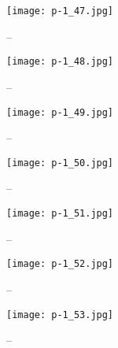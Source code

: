 \clearpage


\begin{figure}
    \begin{center}
        \texttt{[image: p-1\_47.jpg]}
        \caption{--}
    \end{center}
\end{figure}

\clearpage


\begin{figure}
    \begin{center}
        \texttt{[image: p-1\_48.jpg]}
        \caption{--}
    \end{center}
\end{figure}

\clearpage


\begin{figure}
    \begin{center}
        \texttt{[image: p-1\_49.jpg]}
        \caption{--}
    \end{center}
\end{figure}

\clearpage


\begin{figure}
    \begin{center}
        \texttt{[image: p-1\_50.jpg]}
        \caption{--}
    \end{center}
\end{figure}

\clearpage


\begin{figure}
    \begin{center}
        \texttt{[image: p-1\_51.jpg]}
        \caption{--}
    \end{center}
\end{figure}

\clearpage


\begin{figure}
    \begin{center}
        \texttt{[image: p-1\_52.jpg]}
        \caption{--}
    \end{center}
\end{figure}

\clearpage


\begin{figure}
    \begin{center}
        \texttt{[image: p-1\_53.jpg]}
        \caption{--}
    \end{center}
\end{figure}

